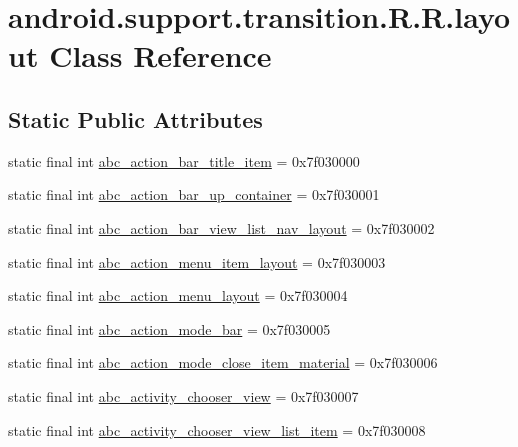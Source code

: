 \hypertarget{classandroid_1_1support_1_1transition_1_1_r_1_1layout}{
\section{android.support.transition.R.R.layout Class Reference}
\label{classandroid_1_1support_1_1transition_1_1_r_1_1layout}
}
\subsection*{Static Public Attributes}
\begin{CompactItemize}
\item 
static final int \hyperlink{classandroid_1_1support_1_1transition_1_1_r_1_1layout_a8e39688f86f85f54edfe0ea24318ba6}{abc\_\-action\_\-bar\_\-title\_\-item} = 0x7f030000
\item 
static final int \hyperlink{classandroid_1_1support_1_1transition_1_1_r_1_1layout_4bff70016c30ca9e543500962bf520b6}{abc\_\-action\_\-bar\_\-up\_\-container} = 0x7f030001
\item 
static final int \hyperlink{classandroid_1_1support_1_1transition_1_1_r_1_1layout_1d699ee83ac7014250fbc26666f086ee}{abc\_\-action\_\-bar\_\-view\_\-list\_\-nav\_\-layout} = 0x7f030002
\item 
static final int \hyperlink{classandroid_1_1support_1_1transition_1_1_r_1_1layout_1f212ae6b937cc57024b872816c142fa}{abc\_\-action\_\-menu\_\-item\_\-layout} = 0x7f030003
\item 
static final int \hyperlink{classandroid_1_1support_1_1transition_1_1_r_1_1layout_05f38d848acafb2b7c2739281aace043}{abc\_\-action\_\-menu\_\-layout} = 0x7f030004
\item 
static final int \hyperlink{classandroid_1_1support_1_1transition_1_1_r_1_1layout_b20e0907fd313790d277a26bda536eff}{abc\_\-action\_\-mode\_\-bar} = 0x7f030005
\item 
static final int \hyperlink{classandroid_1_1support_1_1transition_1_1_r_1_1layout_bec20615aed775bc2f6efcdc0cec1ee2}{abc\_\-action\_\-mode\_\-close\_\-item\_\-material} = 0x7f030006
\item 
static final int \hyperlink{classandroid_1_1support_1_1transition_1_1_r_1_1layout_914a8a138e982a40130f9e9f5026030a}{abc\_\-activity\_\-chooser\_\-view} = 0x7f030007
\item 
static final int \hyperlink{classandroid_1_1support_1_1transition_1_1_r_1_1layout_d48a94d3c885236df7b9738e3c846578}{abc\_\-activity\_\-chooser\_\-view\_\-list\_\-item} = 0x7f030008

\end{CompactItemize}
